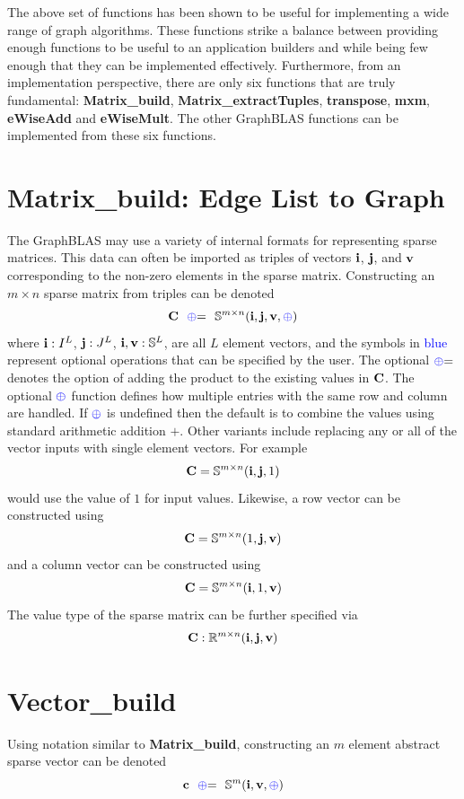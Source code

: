 The above set of functions has been shown to be useful for implementing a wide range of graph algorithms.  These functions strike a balance between providing enough functions to be useful to an application builders and while being few enough that they can be implemented effectively.  Furthermore, from an implementation perspective, there are only six functions that are truly fundamental: {\bf Matrix\_build}, {\bf Matrix\_extractTuples}, {\bf transpose}, {\bf mxm},  {\bf eWiseAdd} and {\bf eWiseMult}.  The other GraphBLAS functions can be implemented from these six functions.


\section{Matrix\_build: Edge List to Graph}
  The GraphBLAS may use a variety of internal formats for representing sparse matrices.  This data can often be imported as triples of vectors ${\bf i}$, ${\bf j}$, and ${\bf v}$ corresponding to the non-zero elements in the sparse matrix.  Constructing an $m \times n$ sparse matrix from triples can be denoted
$$
   \mathbf{C}  ~~ {\textcolor{blue}{\oplus}}{=} ~~  \mathbb{S}^{m \times n}({\bf i},{\bf j},{\bf v},{\textcolor{blue}{\oplus}})
$$
where ${\bf i} : I^L$, ${\bf j}: J^L$, ${\bf i}, {\bf v}: \mathbb{S}^L$, are all $L$ element vectors, and the symbols in \textcolor{blue}{blue} represent optional operations that can be specified by the user.  The optional ${\textcolor{blue}{\oplus}}{=}$ denotes the option of adding the product to the existing values in ${\bf C}$.  The optional  ${\textcolor{blue}{\oplus}}$ function defines how multiple entries with the same row and column are handled.  If ${\textcolor{blue}{\oplus}}$ is undefined then the default is to combine the values using standard arithmetic addition $+$.  Other variants include replacing any or all of the vector inputs with single element vectors.  For example
$$
   \mathbf{C} = \mathbb{S}^{m \times n}({\bf i},{\bf j},1)
$$
would use the value of $1$ for input values.  Likewise, a row vector can be constructed using
$$
   \mathbf{C} = \mathbb{S}^{m \times n}(1,{\bf j},{\bf v})
$$
and a column vector can be constructed using
$$
   \mathbf{C} = \mathbb{S}^{m \times n}({\bf i},1,{\bf v})
$$
The value type of the sparse matrix can be further specified via
$$
   \mathbf{C}: \mathbb{R}^{m \times n}({\bf i},{\bf j},{\bf v})
$$

\section{Vector\_build}
  Using notation similar to {\bf Matrix\_build}, constructing an $m$ element abstract sparse vector can be denoted
$$
   \mathbf{c}  ~~ {\textcolor{blue}{\oplus}}{=} ~~  \mathbb{S}^{m}({\bf i},{\bf v},{\textcolor{blue}{\oplus}})
$$
  
